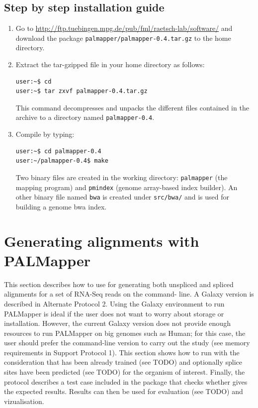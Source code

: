 \documentclass{article}
\begin{document}
\subsection{Step by step installation guide}
\label{sec:installguide}

\begin{enumerate}
\item Go to \url{http://ftp.tuebingen.mpg.de/pub/fml/raetsch-lab/software/}
    and download the package \texttt{palmapper/palmapper-0.4.tar.gz}
    to the home directory. 

\item Extract the tar-gzipped file in your home directory as follows:
\begin{verbatim}user:~$ cd
user:~$ tar zxvf palmapper-0.4.tar.gz\end{verbatim}
This command decompresses and unpacks the different files contained in
the archive to a directory named \texttt{palmapper-0.4}.

\item Compile \PALMapper{} by typing:
\begin{verbatim}user:~$ cd palmapper-0.4
user:~/palmapper-0.4$ make\end{verbatim}
Two binary files are created in the working directory: \texttt{palmapper} (the
mapping program) and \texttt{pmindex} (genome array-based index
builder). An other binary file named \texttt{bwa} is created under
\texttt{src/bwa/} and is used for building a genome bwa index.
\end{enumerate}

\section{Generating alignments with PALMapper}
\label{sec:aligning}

This section describes how to use \PALMapper{} for generating both unspliced
and spliced alignments for a set of RNA-Seq reads on the command-
line. A Galaxy version is described in Alternate Protocol
2. Using the Galaxy environment to run PALMapper is ideal if the user does not want
to worry about storage or installation. However, the current Galaxy version does not
provide enough resources to run PALMapper on big genomes such as Human; for this
case, the user should prefer the command-line version to carry out the study (see memory
requirements in Support Protocol 1).
This section shows how to run \PALMapper{} with the consideration that \QP{} has
been already trained (see TODO) and optionally splice sites have been predicted
(see TODO) for the organism of interest. Finally, the protocol describes a
test case included in the package that checks whether \PALMapper{} gives the expected
results. Results can then be used for evaluation (see TODO) and
vizualisation.
\end{document}
